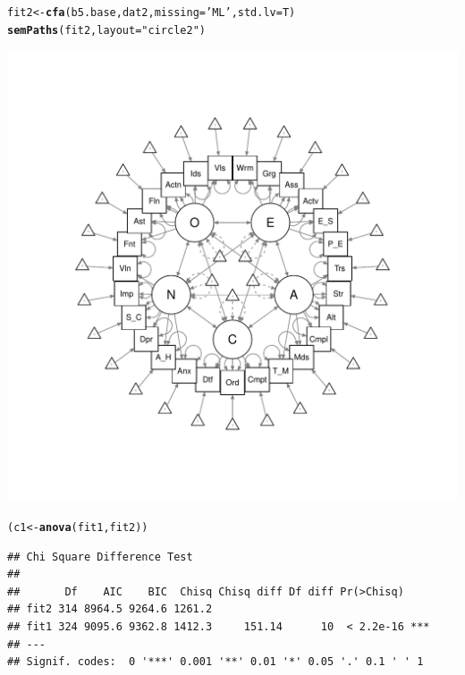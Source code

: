 \documentclass{article}\usepackage[]{graphicx}\usepackage[]{color}
\makeatletter
\def\maxwidth{ %
  \ifdim\Gin@nat@width>\linewidth
    \linewidth
  \else
    \Gin@nat@width
  \fi
}
\newcommand{\hlstr}[1]{\textcolor[rgb]{0.192,0.494,0.8}{#1}}%
\newcommand{\hlstd}[1]{\textcolor[rgb]{0.345,0.345,0.345}{#1}}%
\newcommand{\hlkwb}[1]{\textcolor[rgb]{0.69,0.353,0.396}{#1}}%
\newcommand{\hlkwc}[1]{\textcolor[rgb]{0.333,0.667,0.333}{#1}}%
\newcommand{\hlkwd}[1]{\textcolor[rgb]{0.737,0.353,0.396}{\textbf{#1}}}%
\newenvironment{kframe}{%
 \def\at@end@of@kframe{}%
 \ifinner\ifhmode%
  \def\at@end@of@kframe{\end{minipage}}%
  \begin{minipage}{\columnwidth}%
 \fi\fi%
 \def\FrameCommand##1{\hskip\@totalleftmargin \hskip-\fboxsep
 \colorbox{shadecolor}{##1}\hskip-\fboxsep
     \hskip-\linewidth \hskip-\@totalleftmargin \hskip\columnwidth}%
 \MakeFramed {\advance\hsize-\width
   \@totalleftmargin\z@ \linewidth\hsize
   \@setminipage}}%
 {\par\unskip\endMakeFramed%
 \at@end@of@kframe}
\newenvironment{knitrout}{}{} %
\makeatother
\begin{document}
\begin{knitrout}
\color{fgcolor}\begin{kframe}
\begin{alltt}
\hlstd{fit2} \hlkwb{<-} \hlkwd{cfa}\hlstd{(b5.base, dat2,} \hlkwc{missing} \hlstd{=} \hlstr{'ML'}\hlstd{,} \hlkwc{std.lv} \hlstd{= T)}
\hlkwd{semPaths}\hlstd{(fit2,} \hlkwc{layout} \hlstd{=} \hlstr{"circle2"}\hlstd{)}
\end{alltt}
\end{kframe}
\includegraphics[width=\maxwidth]{figure/unnamed-chunk-7-1} 
\begin{kframe}\begin{alltt}
\hlstd{(c1} \hlkwb{<-} \hlkwd{anova}\hlstd{(fit1, fit2))}
\end{alltt}
\begin{verbatim}
## Chi Square Difference Test
## 
##       Df    AIC    BIC  Chisq Chisq diff Df diff Pr(>Chisq)    
## fit2 314 8964.5 9264.6 1261.2                                  
## fit1 324 9095.6 9362.8 1412.3     151.14      10  < 2.2e-16 ***
## ---
## Signif. codes:  0 '***' 0.001 '**' 0.01 '*' 0.05 '.' 0.1 ' ' 1
\end{verbatim}
\end{kframe}
\end{knitrout}
\end{document}

